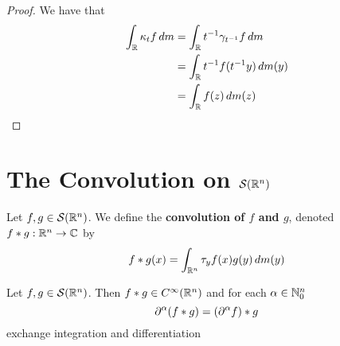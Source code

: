 \documentclass{book}
\begin{document}
	\begin{proof}
		We have that 
		\begin{align*}
			\int_{\mathbb{R}} \kappa_t f \, d m
			& = \int_{\mathbb{R}} t^{-1} \gamma_{t^{-1}} f \, d m \\
			& = \int_{\mathbb{R}} t^{-1} f(t^{-1} y) \, d m(y) \\
			& = \int_{\mathbb{R}}  f(z) \, d m(z) \\
		\end{align*}
	\end{proof}




































\newpage
\section{The Convolution on $\mathcal{S}(\mathbb{R}^n)$}

	\begin{defn}
		Let $f, g \in \mathcal{S}(\mathbb{R}^n)$. We define the \textbf{convolution of $f$ and $g$}, denoted $f * g: \mathbb{R}^n \rightarrow \mathbb{C}$ by $$f*g(x) = \int_{\mathbb{R}^n} \tau_yf(x) g(y) \, d m(y)$$
	\end{defn}

	\begin{ex}
		Let $f,g \in \mathcal{S}(\mathbb{R}^n)$. Then $f*g \in C^{\infty}(\mathbb{R}^n)$ and for each $\alpha \in \mathbb{N}_0^n$
		$$\partial^{\alpha}(f*g) = (\partial^{\alpha}f)*g$$ 
		 exchange integration and differentiation
	\end{ex}
\end{document}
